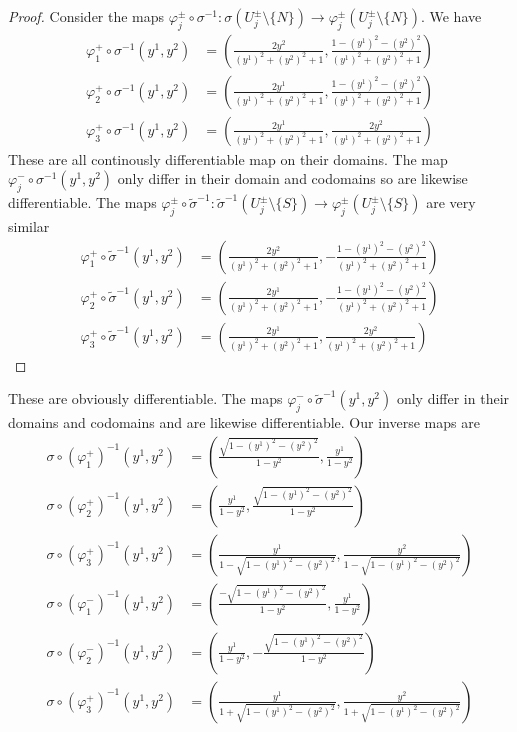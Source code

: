 \documentclass[a4paper]{article}
\begin{document}
\begin{proof}
  Consider the maps $\varphi_j^{\pm} \circ \sigma^{-1}: \sigma(U^{\pm}_j \setminus \{N\}) \rightarrow \varphi_j^{\pm}(U^{\pm}_j \setminus\{N\})$. We have
  \[
    \begin{aligned}
      \varphi_1^{+} \circ \sigma^{-1}(y^1, y^2) &= \left( \frac{2y^2}{(y^1)^2 + (y^2)^2 +1}, \frac{1 - (y^1)^2 - (y^2)^2}{(y^1)^2 + (y^2)^2 + 1}\right) \\
      \varphi_2^{+} \circ \sigma^{-1}(y^1, y^2) &= \left( \frac{2y^1}{(y^1)^2 + (y^2)^2 +1}, \frac{1 - (y^1)^2 - (y^2)^2}{(y^1)^2 + (y^2)^2 + 1}\right) \\
      \varphi_3^{+} \circ \sigma^{-1}(y^1, y^2) &=  \left( \frac{2y^1}{(y^1)^2 + (y^2)^2 + 1}, \frac{2y^2}{(y^1)^2 + (y^2)^2 + 1}\right)
    \end{aligned}
  \]
  These are all continously differentiable map on their domains. The map $\varphi_j^{-} \circ \sigma^{-1}(y^1, y^2)$ only differ in their domain and codomains so are likewise differentiable. The maps $\varphi_j^{\pm} \circ \tilde{\sigma}^{-1}: \tilde{\sigma}^{-1}(U_j^{\pm} \setminus \{S\}) \rightarrow \varphi_j^{\pm}(U_j^{\pm} \setminus \{S\})$ are very similar
  \[
    \begin{aligned}
      \varphi_1^{+} \circ \tilde{\sigma}^{-1}(y^1, y^2) &= \left( \frac{2y^2}{(y^1)^2 + (y^2)^2 +1}, -\frac{1 - (y^1)^2 - (y^2)^2}{(y^1)^2 + (y^2)^2 + 1}\right) \\
      \varphi_2^{+} \circ \tilde{\sigma}^{-1}(y^1, y^2) &= \left( \frac{2y^1}{(y^1)^2 + (y^2)^2 +1}, -\frac{1 - (y^1)^2 - (y^2)^2}{(y^1)^2 + (y^2)^2 + 1}\right) \\
      \varphi_3^{+} \circ \tilde{\sigma}^{-1}(y^1, y^2) &=  \left( \frac{2y^1}{(y^1)^2 + (y^2)^2 + 1}, \frac{2y^2}{(y^1)^2 + (y^2)^2 + 1}\right)
    \end{aligned}
  \]
\end{proof}
These are obviously differentiable. The maps $\varphi_j^{-} \circ \tilde{\sigma}^{-1}(y^1, y^2)$ only differ in their domains and codomains and are likewise differentiable. Our inverse maps are
\[
  \begin{aligned}
    \sigma \circ (\varphi^+_1)^{-1}(y^1, y^2) &= \left(\frac{\sqrt{1 - (y^1)^2 - (y^2)^2}}{1 - y^2} , \frac{y^1}{1 - y^2}\right)\\
    \sigma \circ (\varphi^+_2)^{-1}(y^1, y^2) &= \left( \frac{y^1}{1 - y^2}, \frac{\sqrt{1 - (y^1)^2 - (y^2)^2}}{1 - y^2} \right)\\
    \sigma \circ (\varphi^+_3)^{-1}(y^1, y^2) &= \left(\frac{y^1}{1 - \sqrt{1 - (y^1)^2 - (y^2)^2}}, \frac{y^2}{1 - \sqrt{1 - (y^1)^2 - (y^2)^2}}\right) \\
    \sigma \circ (\varphi^-_1)^{-1}(y^1, y^2) &= \left(\frac{-\sqrt{1 - (y^1)^2 - (y^2)^2}}{1 - y^2} , \frac{y^1}{1 - y^2}\right)\\
    \sigma \circ (\varphi^-_2)^{-1}(y^1, y^2) &= \left( \frac{y^1}{1 - y^2}, -\frac{\sqrt{1 - (y^1)^2 - (y^2)^2}}{1 - y^2} \right)\\
    \sigma \circ (\varphi^+_3)^{-1}(y^1, y^2) &= \left(\frac{y^1}{1 + \sqrt{1 - (y^1)^2 - (y^2)^2}}, \frac{y^2}{1 + \sqrt{1 - (y^1)^2 - (y^2)^2}}\right) \\
  \end{aligned}
\]
\end{document}
